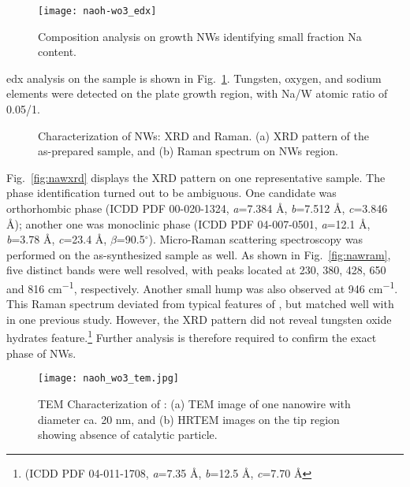 \begin{figure}[htb]
\centering
\texttt{[image: naoh-wo3\_edx]}
\caption[Composition analysis on   growth NWs identifying small fraction Na content]{Composition analysis on   growth NWs identifying small fraction Na content.}
\label{fig:naohwedx}
\end{figure}
\gls{edx} analysis on the   sample is shown in Fig.~\ref{fig:naohwedx}. Tungsten, oxygen, and sodium elements were detected on the plate growth region, with Na/W atomic ratio of 0.05/1. 
\begin{figure}[htb]
\centering
{}\hspace{0.04\textwidth}
\caption[Characterization of   NWs: XRD and Raman]{Characterization of   NWs: XRD and Raman. (a) XRD pattern of the as-prepared sample, and (b) Raman spectrum on NWs region.}
\label{fig:naohwxrd}
\end{figure}

Fig.~\ref{fig:nawxrd} displays the XRD pattern on one representative sample. The phase identification turned out to be ambiguous. One candidate was orthorhombic  phase (ICDD PDF 00-020-1324, \emph{a}=7.384 \si{\angstrom}, \emph{b}=7.512 \si{\angstrom}, \emph{c}=3.846 \si{\angstrom}); another one was monoclinic  phase (ICDD PDF 04-007-0501, \emph{a}=12.1 \si{\angstrom}, \emph{b}=3.78 \si{\angstrom}, \emph{c}=23.4 \si{\angstrom}, $\beta$=90.5$^\circ$). Micro-Raman scattering spectroscopy was performed on the as-synthesized sample as well. As shown in Fig.~\ref{fig:nawram}, five distinct bands were well resolved, with peaks located at 230, 380, 428, 650 and 816 \si{cm^{-1}}, respectively. Another small hump was also observed at 946 \si{cm^{-1}}. This Raman spectrum deviated from typical features of ,\cite{Salje1975a,Dixit1986} but matched well with  in one previous study.\cite{Daniel1987} However, the XRD pattern did not reveal tungsten oxide hydrates feature.\footnote{(ICDD PDF 04-011-1708, \emph{a}=7.35 \si{\angstrom}, \emph{b}=12.5 \si{\angstrom}, \emph{c}=7.70 \si{\angstrom}} Further analysis is therefore required to confirm the exact phase of   NWs.\cite{Azimirad2009a} 

\begin{figure}[htb]
\centering
\texttt{[image: naoh\_wo3\_tem.jpg]}
\caption[Characterization of  : TEM]{TEM Characterization of  : (a) TEM image of one nanowire with diameter ca. 20 nm, and (b) HRTEM images on the tip region showing absence of catalytic particle.}
\label{fig:naohwtem}
\end{figure}

